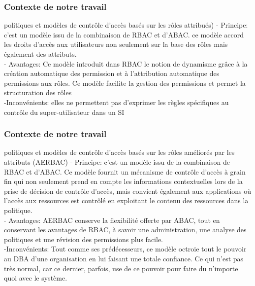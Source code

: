 \documentclass[10pt]{beamer}
\begin{document}
\begin{frame}
 \frametitle{Contexte de notre travail}
  \begin{block}{ politiques et modèles de contrôle d'accès basés sur les rôles attribués)}
    - Principe: c'est un modèle issu de la combinaison de RBAC et d'ABAC. ce modèle accord les droits d'accès aux utilisateurs non seulement sur la base des rôles mais également des attributs.\\
    - Avantages: Ce modèle introduit dans RBAC le notion de dynamisme grâce à la création automatique des permission et à l'attribution automatique des permissions aux rôles. Ce modèle facilite la gestion des permissions et permet la structuration des rôles \\
    -Inconvénients: elles ne permettent pas d'exprimer les règles spécifiques au contrôle du super-utilisateur dans un SI
  \end{block}
\end{frame}

\begin{frame}
 \frametitle{Contexte de notre travail}
  \begin{block}{ politiques et modèles de contrôle d'accès basés sur les rôles améliorés par les attributs (AERBAC)}
    - Principe: c'est un modèle issu de la combinaison de RBAC et d'ABAC. Ce modèle fournit un mécanisme de contrôle d'accès à grain fin qui non seulement prend en compte les informations contextuelles lors de la prise de décision de contrôle d'accès, mais convient également aux applications où l'accès aux ressources est contrôlé en exploitant le contenu des ressources dans la politique.  \\
    - Avantages: AERBAC conserve la flexibilité offerte par ABAC, tout en conservant les avantages de RBAC, à savoir une administration, une analyse des politiques et une révision des permissions plus facile.  \\
    -Inconvénients: Tout comme ses prédécesseurs, ce modèle octroie tout le pouvoir au DBA d'une organisation en lui faisant une totale confiance. Ce qui n'est pas très normal, car ce dernier, parfois, use de ce pouvoir pour faire du n'importe quoi avec le système.

  \end{block}
\end{frame}
\end{document}
